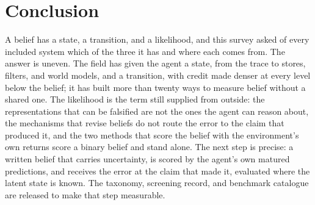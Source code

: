 \section{Conclusion}
\label{sec:conclusion}

A belief has a state, a transition, and a likelihood, and this survey asked of every included system which of the three it has and where each comes from. The answer is uneven. The field has given the agent a state, from the trace to stores, filters, and world models, and a transition, with credit made denser at every level below the belief; it has built more than twenty ways to measure belief without a shared one. The likelihood is the term still supplied from outside: the representations that can be falsified are not the ones the agent can reason about, the mechanisms that revise beliefs do not route the error to the claim that produced it, and the two methods that score the belief with the environment's own returns score a binary belief and stand alone. The next step is precise: a written belief that carries uncertainty, is scored by the agent's own matured predictions, and receives the error at the claim that made it, evaluated where the latent state is known. The taxonomy, screening record, and benchmark catalogue are released to make that step measurable.\artifacturl
